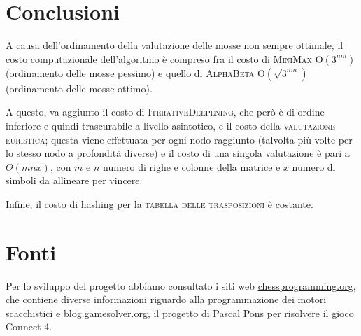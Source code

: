 \documentclass{article}
\begin{document}
\section{Conclusioni}
A causa dell'ordinamento della valutazione delle mosse non sempre ottimale, il costo 
computazionale dell'algoritmo è compreso fra il costo di \textsc{MiniMax} O$(3^{nm})$ (ordinamento delle mosse
pessimo) e quello di \textsc{AlphaBeta} O$({\sqrt{3^{nm}}})$ (ordinamento delle mosse ottimo). 

A questo, va aggiunto il costo di \textsc{IterativeDeepening}, che però è di ordine inferiore e quindi 
trascurabile a livello asintotico, e il costo della \textsc{valutazione euristica}; questa viene effettuata 
per ogni nodo raggiunto (talvolta più volte per lo stesso nodo a profondità diverse) e il costo di una singola 
valutazione è pari a $\Theta(mnx)$, con $m$ e $n$ numero di righe e colonne della matrice e $x$ numero di simboli
da allineare per vincere.

Infine, il costo di hashing per la \textsc{tabella delle trasposizioni} è costante.

\section{Fonti}

Per lo sviluppo del progetto abbiamo consultato i siti web 
\href{https://www.chessprogramming.org}{chessprogramming.org}, che contiene diverse informazioni riguardo alla programmazione 
dei motori scacchistici e \href{http://blog.gamesolver.org}{blog.gamesolver.org}, 
il progetto di Pascal Pons per risolvere il gioco Connect 4.
\end{document}

